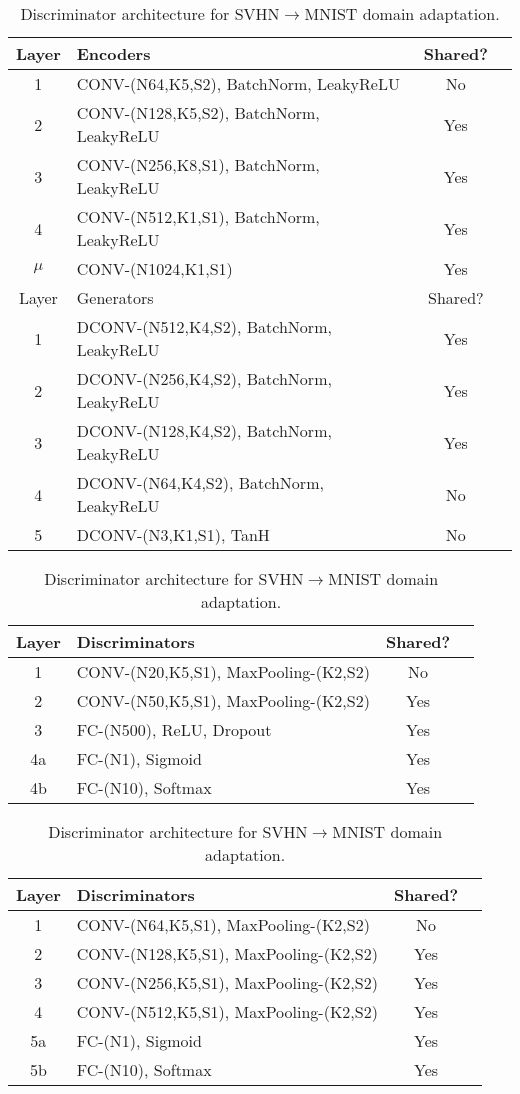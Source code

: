 \documentclass{article}
\begin{document}
\begin{table}[tbh!]
\caption{\small Encoder and generator architecture for MNIST$\leftrightarrow$USPS domain adaptation.}
\label{tbl::digit_vae}
\small
\centering
\begin{tabularx}{265pt}{clcc}
\toprule
Layer &  Encoders & Shared? \tabularnewline\midrule
1 & CONV-(N64,K5,S2), BatchNorm, LeakyReLU &No\tabularnewline
2 & CONV-(N128,K5,S2), BatchNorm, LeakyReLU  &Yes\tabularnewline
3 & CONV-(N256,K8,S1), BatchNorm, LeakyReLU  &Yes\tabularnewline
4 & CONV-(N512,K1,S1), BatchNorm, LeakyReLU  &Yes\tabularnewline
$\mu$ & CONV-(N1024,K1,S1) &Yes\tabularnewline\midrule
Layer &  Generators & Shared?\tabularnewline\midrule
1 &  DCONV-(N512,K4,S2), BatchNorm, LeakyReLU & Yes\tabularnewline
2 &  DCONV-(N256,K4,S2), BatchNorm, LeakyReLU &Yes\tabularnewline
3 &  DCONV-(N128,K4,S2), BatchNorm, LeakyReLU &Yes\tabularnewline
4 &  DCONV-(N64,K4,S2), BatchNorm, LeakyReLU &No\tabularnewline
5 &  DCONV-(N3,K1,S1), TanH & No\tabularnewline\midrule
\end{tabularx}
\caption{\small Discriminator architecture for MNIST$\leftrightarrow$USPS domain adaptation.}
\label{tbl::digit_lenet}
\small
\centering
\begin{tabularx}{265pt}{clcc}
\toprule
Layer &  Discriminators & Shared? \tabularnewline\midrule
1 & CONV-(N20,K5,S1), MaxPooling-(K2,S2) &No\tabularnewline
2 & CONV-(N50,K5,S1), MaxPooling-(K2,S2) &Yes\tabularnewline
3 & FC-(N500), ReLU, Dropout  &Yes\tabularnewline
4a & FC-(N1), Sigmoid  &Yes\tabularnewline
4b & FC-(N10), Softmax  &Yes\tabularnewline\bottomrule
\end{tabularx}
\caption{\small Discriminator architecture for SVHN$\rightarrow$MNIST domain adaptation.}
\label{tbl::arch_maxpool_svhn}
\small
\centering
\begin{tabularx}{265pt}{clcc}
\toprule
Layer &  Discriminators & Shared? \tabularnewline\midrule
1 & CONV-(N64,K5,S1), MaxPooling-(K2,S2) &No\tabularnewline
2 & CONV-(N128,K5,S1), MaxPooling-(K2,S2) &Yes\tabularnewline
3 & CONV-(N256,K5,S1), MaxPooling-(K2,S2) &Yes\tabularnewline
4 & CONV-(N512,K5,S1), MaxPooling-(K2,S2) &Yes\tabularnewline
5a & FC-(N1), Sigmoid  &Yes\tabularnewline
5b & FC-(N10), Softmax  &Yes\tabularnewline\bottomrule
\end{tabularx}
\end{table}


 
\end{document}

